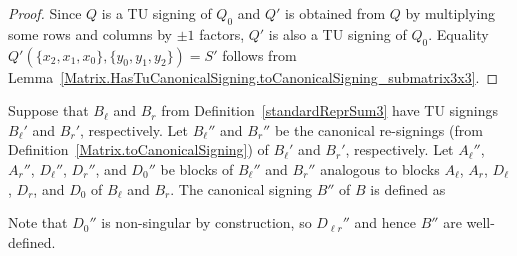 \begin{proof}
    \leanok
    Since $Q$ is a TU signing of $Q_{0}$ and $Q'$ is obtained from $Q$ by multiplying some rows and columns by $\pm 1$ factors, $Q'$ is also a TU signing of $Q_{0}$. Equality $Q' (\{x_{2}, x_{1}, x_{0}\}, \{y_{0}, y_{1}, y_{2}\}) = S'$ follows from Lemma~\ref{Matrix.HasTuCanonicalSigning.toCanonicalSigning_submatrix3x3}.
\end{proof}

\begin{definition}
    \label{MatrixSum3.toCanonicalSigning}
    \leanok
    Suppose that $B_{\ell}$ and $B_{r}$ from Definition~\ref{standardReprSum3} have TU signings $B_{\ell}'$ and $B_{r}'$, respectively. Let $B_{\ell}''$ and $B_{r}''$ be the canonical re-signings (from Definition~\ref{Matrix.toCanonicalSigning}) of $B_{\ell}'$ and $B_{r}'$, respectively. Let $A_{\ell}''$, $A_{r}''$, $D_{\ell}''$, $D_{r}''$, and $D_{0}''$ be blocks of $B_{\ell}''$ and $B_{r}''$ analogous to blocks $A_{\ell}$, $A_{r}$, $D_{\ell}$, $D_{r}$, and $D_{0}$ of $B_{\ell}$ and $B_{r}$. The canonical signing $B''$ of $B$ is defined as
    \begin{center}
        \noindent
    \end{center}
    Note that $D_{0}''$ is non-singular by construction, so $D_{\ell r}''$ and hence $B''$ are well-defined.
\end{definition}


